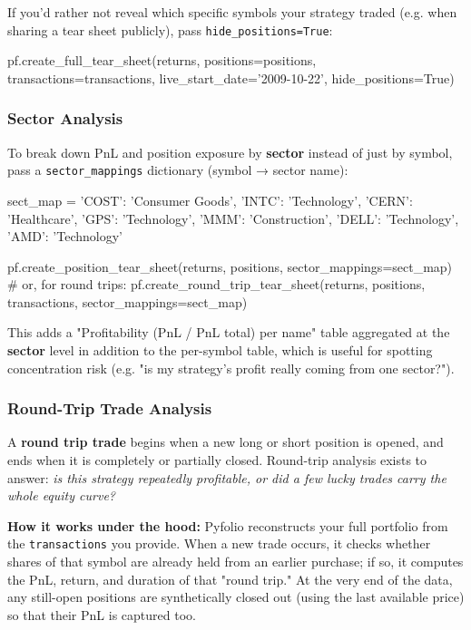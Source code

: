 \documentclass[12pt,openany]{book}
\theoremstyle{definition}
\theoremstyle{remark}
\begin{document}
If you'd rather not reveal which specific symbols your strategy traded (e.g. when sharing a tear sheet publicly), pass \texttt{hide\_positions=True}:

\begin{python}
pf.create_full_tear_sheet(returns, positions=positions, transactions=transactions,
                          live_start_date='2009-10-22', hide_positions=True)
\end{python}
\subsubsection{Sector Analysis}

To break down PnL and position exposure by \textbf{sector} instead of just by symbol, pass a \texttt{sector\_mappings} dictionary (symbol → sector name):

\begin{python}
sect_map = {'COST': 'Consumer Goods', 'INTC': 'Technology', 'CERN': 'Healthcare',
            'GPS': 'Technology', 'MMM': 'Construction', 'DELL': 'Technology', 'AMD': 'Technology'}

pf.create_position_tear_sheet(returns, positions, sector_mappings=sect_map)
# or, for round trips:
pf.create_round_trip_tear_sheet(returns, positions, transactions, sector_mappings=sect_map)
\end{python}

This adds a "Profitability (PnL / PnL total) per name" table aggregated at the \textbf{sector} level in addition to the per-symbol table, which is useful for spotting concentration risk (e.g. "is my strategy's profit really coming from one sector?").
\subsubsection{Round-Trip Trade Analysis}

A \textbf{round trip trade} begins when a new long or short position is opened, and ends when it is completely or partially closed. Round-trip analysis exists to answer: \emph{is this strategy repeatedly profitable, or did a few lucky trades carry the whole equity curve?}

\textbf{How it works under the hood:} Pyfolio reconstructs your full portfolio from the \texttt{transactions} you provide. When a new trade occurs, it checks whether shares of that symbol are already held from an earlier purchase; if so, it computes the PnL, return, and duration of that "round trip." At the very end of the data, any still-open positions are synthetically closed out (using the last available price) so that their PnL is captured too.
\end{document}
